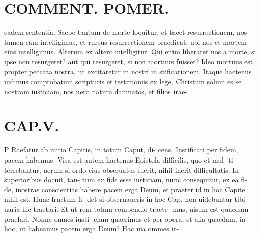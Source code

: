 \documentclass{article}
\begin{document}
\begin{pages}
\section*{COMMENT. POMER.  }\pstart eadem sententia. Saepe tantum de morte loquitur, et tacet resurrectionem, nos tamen eam intelligimus, et rursus resurrectionem praedicat, ubi nos et mortem eius intelligimus. Alterum ex altero intelligitur. Qui enim liberaret nos a morte, si ipse non resurgeret? aut qui resurgeret, si non mortuus fuisset? Ideo mortuus est propter peccata nostra, ut excitaretur in nostri iu stificationem. Itaque hactenus uidimus comprobatum scripturis et testimoniis ex lege, Christum solum es se nostram iusticiam, nos uero natura damnatos, et filios irae-  \pend
\endnumbering\beginnumbering\section{CAP.V.}\pstart P  \pend\pstart Raefatur ab initio Capitis, in totum Caput, di- cens, Iustificati per fidem, pacem habemus- Visa est autem hactenus Epistola difficilis, quo et mul- ti terrebantur, uerum si ordo eius obseruatus fuerit, nihil inerit difficultatis. In superioribus docuit, tan- tum ex fide esse iusticiam, nunc consequitur, ex ea fi- de, inostras conscientias habere pacem erga Deum, et praeter id in hoc Capite nihil est. Hunc fructum fi- det si obseruaueris in hoc Cap. non uidebuntur tibi uaria hic tractari. Et ut rem totam compendio tracte- mus, uisum est quaedam praefari. Nonne omnes iusti- ciam quaerimus et per opera, et alia quaedam, in hoc, ut habeamus pacem erga Deum? Hac uia ommes ir-  \pend

\end{pages}
\end{document}
